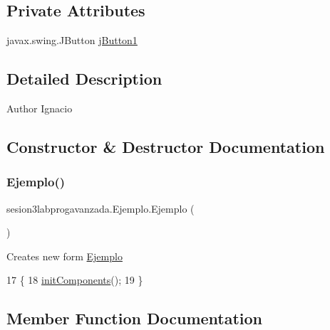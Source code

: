 \subsection*{Private Attributes}
\begin{DoxyCompactItemize}
\item 
javax.\+swing.\+J\+Button \mbox{\hyperlink{classsesion3labprogavanzada_1_1_ejemplo_a6a4f016ed7635a1b0293cbac72ee8933}{j\+Button1}}
\end{DoxyCompactItemize}


\subsection{Detailed Description}
\begin{DoxyAuthor}{Author}
Ignacio 
\end{DoxyAuthor}


\subsection{Constructor \& Destructor Documentation}
\mbox{\label{classsesion3labprogavanzada_1_1_ejemplo_a8e39fb4b471c241ca4320630761ba9ec}} 
\subsubsection{\texorpdfstring{Ejemplo()}{Ejemplo()}}
{\footnotesize\ttfamily sesion3labprogavanzada.\+Ejemplo.\+Ejemplo (\begin{DoxyParamCaption}{ }\end{DoxyParamCaption})\hspace{0.3cm}{\ttfamily [inline]}}

Creates new form \mbox{\hyperlink{classsesion3labprogavanzada_1_1_ejemplo}{Ejemplo}} 
\begin{DoxyCode}
17                      \{
18         \mbox{\hyperlink{classsesion3labprogavanzada_1_1_ejemplo_a6a1ce57e4ba1aa142cdd8b608ff05f74}{initComponents}}();
19     \}
\end{DoxyCode}


\subsection{Member Function Documentation}
\mbox{\label{classsesion3labprogavanzada_1_1_ejemplo_a6a1ce57e4ba1aa142cdd8b608ff05f74}} 

